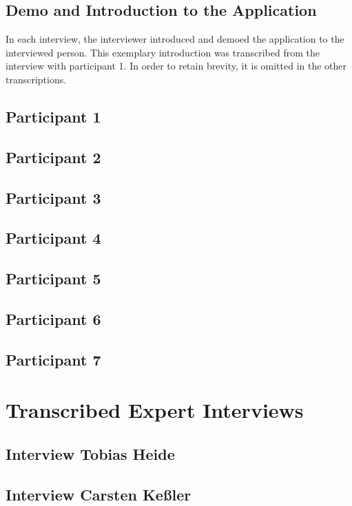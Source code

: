 \subsection{Demo and Introduction to the Application}

In each interview, the interviewer introduced and demoed the application to the interviewed person. This exemplary introduction was transcribed from the interview with participant 1. In order to retain brevity, it is omitted in the other transcriptions.



\subsection{Participant 1}



\subsection{Participant 2}



\subsection{Participant 3}



\subsection{Participant 4}



\subsection{Participant 5}



\subsection{Participant 6}



\subsection{Participant 7}



\section{Transcribed Expert Interviews}

\subsection{Interview Tobias Heide}



\subsection{Interview Carsten Ke{\ss}ler}

